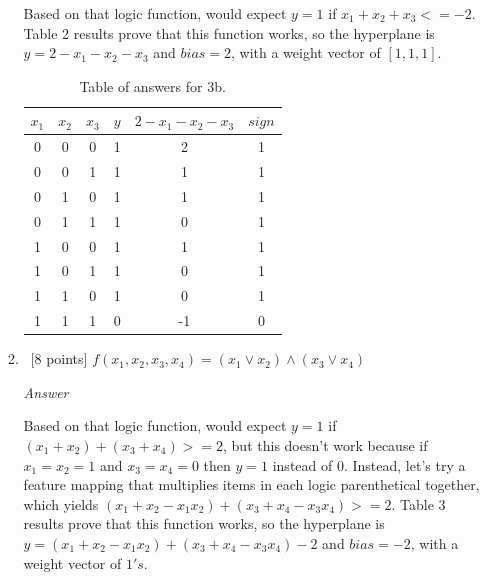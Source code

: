 \documentclass[12pt, fullpage,letterpaper]{article}
\begin{document}
\begin{enumerate}
\begin{enumerate}
		Based on that logic function, would expect $y=1$ if $x_1+x_2+x_3<=-2$. Table 2 results prove that this function works, so the hyperplane is $y=2-x_1-x_2-x_3$ and $bias=2$, with a weight vector of $[1, 1, 1]$.
		
		\begin{table}
        	\centering
        	\begin{tabular}{ccccc|c}
        		$x_1 $ & $x_2$ & $x_3$ & $y$ & $2-x_1-x_2-x_3$ & $sign$\\ 
        		\hline\hline
        		0 & 0 & 0 & 1 &  2 & 1 \\ \hline
        		0 & 0 & 1 & 1 &  1 & 1 \\ \hline
        		0 & 1 & 0 & 1 &  1 & 1 \\ \hline
        		0 & 1 & 1 & 1 &  0 & 1 \\ \hline
        		1 & 0 & 0 & 1 &  1 & 1 \\ \hline
        		1 & 0 & 1 & 1 &  0 & 1 \\ \hline
        		1 & 1 & 0 & 1 &  0 & 1 \\ \hline
        		1 & 1 & 1 & 0 & -1 & 0 \\ \hline
        	\end{tabular}
        	\caption{Table of answers for 3b.}\label{tb:1}
        \end{table}
		
		\item~[8 points] $f(x_1, x_2, x_3, x_4) = (x_1 \lor x_2) \land (x_3 \lor x_4)$
		
		\emph{Answer}
		
		Based on that logic function, would expect $y=1$ if $(x_1+x_2)+(x_3+x_4)>=2$, but this doesn't work because if $x_1=x_2=1$ and $x_3=x_4=0$ then $y=1$ instead of $0$. Instead, let's try a feature mapping that multiplies items in each logic parenthetical together, which yields $(x_1+x_2-x_1x_2)+(x_3+x_4-x_3x_4)>=2$. Table 3 results prove that this function works, so the hyperplane is $y=(x_1+x_2-x_1x_2)+(x_3+x_4-x_3x_4)-2$ and $bias=-2$, with a weight vector of $1's$.
		

\end{enumerate}
\end{enumerate}
\end{document}
